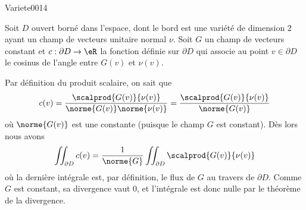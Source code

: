 
\begin{corrige}{Variete0014}

 Soit $D$ ouvert borné dans l'espace, dont le bord est une
  variété de dimension $2$ ayant un champ de vecteurs unitaire normal
  $\nu$. Soit $G$ un champ de vecteurs constant et $c : \partial D
  \to \eR$ la fonction définie sur $\partial D$ qui associe au point
  $v\in\partial D$ le cosinus de l'angle entre $G(v)$ et $\nu(v)$.

  Par définition du produit scalaire, on sait que 
  \begin{equation*}
    c(v) = \frac{\scalprod{G(v)}{\nu(v)}}{\norme{G(v)}\norme{\nu(v)}} = \frac{\scalprod{G(v)}{\nu(v)}}{\norme{G(v)}}
  \end{equation*}
  où $\norme{G(v)}$ est une constante (puisque le champ $G$ est
  constant). Dès lors nous avons
  \begin{equation*}
    \iint_{\partial D} c(v) = \frac1{\norme{G}} \iint_{\partial D}
    \scalprod{G(v)}{\nu(v)} 
  \end{equation*}
  où la dernière intégrale est, par définition, le flux de $G$ au
  travers de $\partial D$. Comme $G$ est constant, sa divergence vaut
  $0$, et l'intégrale est donc nulle par le théorème de la divergence.


\end{corrige}
